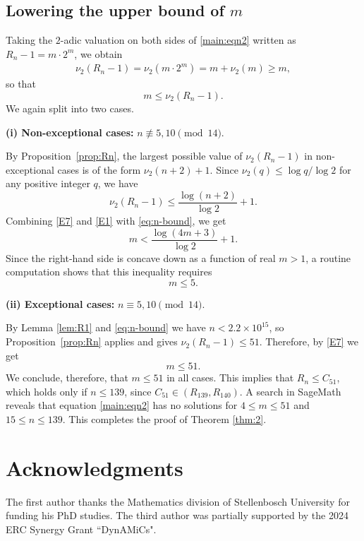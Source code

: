 \documentclass[11pt,a4paper]{article}
\numberwithin{equation}{section}
\numberwithin{table}{section}
\numberwithin{figure}{section}
\begin{document}
\subsection{Lowering the upper bound of $m$}

Taking the $2$-adic valuation on both sides of \eqref{main:eqn2} written as $R_n - 1 = m\cdot 2^m$, we obtain
\begin{align*}
	\nu_2(R_n - 1) = \nu_2(m\cdot 2^m) 
	= m + \nu_2(m) \ge m,
\end{align*}
so that
\begin{equation}\label{E7}
m\le \nu_2(R_n - 1).
\end{equation}
We again split into two cases.

\medskip
\noindent\textbf{(i) Non-exceptional cases:} 
$n\not\equiv 5,10\pmod{14}$.

By Proposition~\ref{prop:Rn}, the largest possible 
value of $\nu_2(R_n-1)$ in non-exceptional cases is 
of the form $\nu_2(n+2)+1$. Since 
$\nu_2(q)\le \log q/\log 2$ for any positive integer 
$q$, we have
\begin{equation}\label{E1}
	\nu_2(R_n-1) \le \frac{\log(n+2)}{\log 2}+1.
\end{equation}
Combining \eqref{E7} and \eqref{E1} with \eqref{eq:n-bound}, we get
\begin{equation*}
	m<\frac{\log(4m+3)}{\log 2}+1.
\end{equation*}
Since the right-hand side is concave down as
a function of real $m>1$, a
routine computation shows that this inequality requires
$$
m\le 5.
$$

\medskip
\noindent\textbf{(ii) Exceptional cases:} 
$n\equiv 5,10\pmod{14}$.

By Lemma \ref{lem:R1} and \eqref{eq:n-bound} we have $n<2.2\times 10^{15}$, 
so Proposition~\ref{prop:Rn} applies and gives 
$\nu_2(R_n-1)\le 51$. Therefore, by \eqref{E7} we get
\begin{equation*}
	m \le 51.
\end{equation*}
We conclude, therefore, that $m\le 51$ in all cases. This implies that $R_{n}\le C_{51}$, which holds only if $n\le 139$, since $C_{51}\in (R_{139},R_{140})$. A search in SageMath reveals that equation \eqref{main:eqn2} has no solutions for $4\le m\le 51$ and $15\le n\le 139$. This completes the proof of Theorem \ref{thm:2}.

\section*{Acknowledgments} 
The first author thanks the Mathematics division of Stellenbosch University for funding his PhD studies. The third author was partially supported by the 2024 ERC Synergy Grant ``DynAMiCs". 
\end{document}
